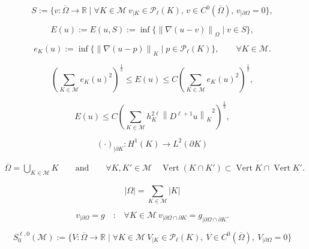 \documentclass[a4paper]{article}
\begin{document}
\begin{equation}
\label{model_subspace}
 {S}
 {:=}
 \Big\{ v:{\overline{\Omega}}\to{\mathbb{R}} \mid 
  \forall{K}\in{\mathcal{M}}\ v_{|{K}}\in{\mathcal{P}_{{\ell}}({{K}})}, \,
  v\in C^0({\overline{\Omega}}), \, v_{|\partial\Omega}=0
 \Big\},
\end{equation}

\begin{equation*}
\label{best-global-error}
 E(u)
 {:=}
 E(u,{S})
 {:=}
 \inf \big\{
  {\left\|{{\nabla}(u-v)}\right\|_{{\Omega}}} \mid v\in{S}
 \big\},
\end{equation*}

\begin{equation*}
\label{local-best-errors}
 e_{K}(u)
 {:=}
 \inf \big\{
  {\left\|{{\nabla}(u-p)}\right\|_{{K}}} \mid p\in{\mathcal{P}_{{\ell}}({{K}})}
 \big\},
\qquad
 \forall{K}\in{\mathcal{M}}.
\end{equation*}

\begin{equation}
\label{equivalence}
 \left(
  \sum_{{K}\in{\mathcal{M}}} e_{K}(u)^2
 \right)^{\frac12}
 \leq
 E(u)
 \leq
 C\left(
  \sum_{{K}\in{\mathcal{M}}} e_{K}(u)^2
 \right)^{\frac12},
\end{equation}

\begin{equation}
\label{apriori-ub}
 E(u)
 \leq
 C \left(
  \sum_{{K}\in{\mathcal{M}}} h_{K}^{2\ell}
   {\left\|{D^{\ell+1} u}\right\|_{{K}}}^2
 \right)^{\frac12},
\end{equation}

\begin{equation}
\label{TraceOp}
 (\cdot)_{|\partial{K}}:{H^{{1}}}({K})\to{L^{{2}}}(\partial{K})
\end{equation}

\begin{gather}
\label{A:conforming_mesh}
 \overline\Omega = \bigcup_{{K}\in{\mathcal{M}}} {K}
\qquad\text{and}\qquad
 \forall {K},{K}'\in{\mathcal{M}}
\quad
 \operatorname{Vert} ({K}\cap{K}') \subset \operatorname{Vert}{K} \cap \operatorname{Vert}{K}'.
\end{gather}

\[
 {\left|{\Omega}\right|}
 =
 \sum_{{K}\in{\mathcal{M}}} {\left|{K}\right|}
\]

\[
 v_{|\partial\Omega}=g
\quad\text{:}\quad
 \forall{K}\in{\mathcal{M}}\ v_{|\partial\Omega\cap\partial{K}} = 
   g_{|\partial\Omega\cap\partial{K}}.
\]

\[
 {S}^{{\ell},0}_0({\mathcal{M}})
 {:=}
 \{ V:\overline\Omega\to{\mathbb{R}} \mid
   \forall{K}\in{\mathcal{M}}\ V_{|{K}}\in{\mathcal{P}_{{\ell}}({{K}})},\ 
    V\in C^0(\overline\Omega),\ 
   V_{|\partial\Omega}=0 \}
\]
\end{document}
